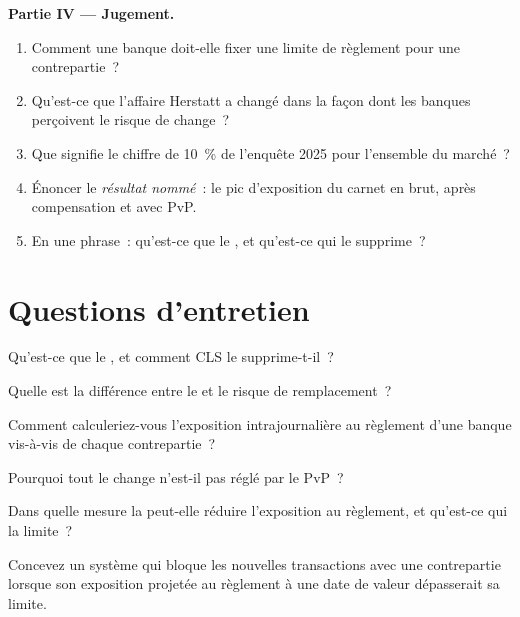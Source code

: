 \begin{problem}
\medskip\noindent\textbf{Partie IV --- Jugement.}
\begin{enumerate}[resume]
\item Comment une banque doit-elle fixer une limite de règlement pour une contrepartie~?
\item Qu'est-ce que l'affaire Herstatt a changé dans la façon dont les banques perçoivent le risque de change~?
\item Que signifie le chiffre de 10~\% de l'enquête 2025 pour l'ensemble du marché~?
\item Énoncer le \emph{résultat nommé}~: le pic d'exposition du carnet en brut, après compensation et
avec PvP.
\item En une phrase~: qu'est-ce que le , et qu'est-ce qui le supprime~?
\end{enumerate}
\end{problem}

\section{Questions d'entretien}

\begin{interviewq}\label{iq:m2:settlement-risk:1}
Qu'est-ce que le , et comment CLS le supprime-t-il~?
\end{interviewq}

\begin{interviewq}\label{iq:m2:settlement-risk:2}
Quelle est la différence entre le  et le risque de remplacement~?
\end{interviewq}

\begin{interviewq}\label{iq:m2:settlement-risk:3}
Comment calculeriez-vous l'exposition intrajournalière au règlement d'une banque vis-à-vis de chaque contrepartie~?
\end{interviewq}

\begin{interviewq}\label{iq:m2:settlement-risk:4}
Pourquoi tout le change n'est-il pas réglé par le PvP~?
\end{interviewq}

\begin{interviewq}\label{iq:m2:settlement-risk:5}
Dans quelle mesure la  peut-elle réduire l'exposition au règlement, et qu'est-ce qui la limite~?
\end{interviewq}

\begin{interviewq}\label{iq:m2:settlement-risk:6}
Concevez un système qui bloque les nouvelles transactions avec une contrepartie lorsque son
exposition projetée au règlement à une date de valeur dépasserait sa limite.
\end{interviewq}
